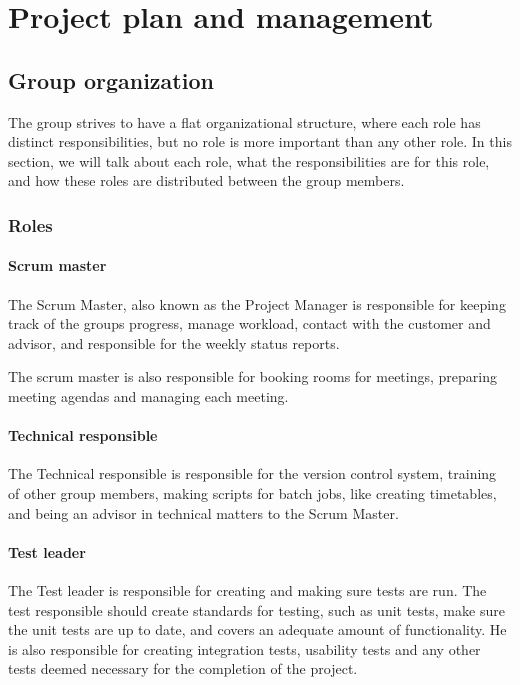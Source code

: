 \section{Project plan and management}


\subsection{Group organization}
The group strives to have a flat organizational structure, where each role has distinct responsibilities, but no role is more important than any other role. In this section, we will talk about each role, what the responsibilities are for this role, and how these roles are distributed between the group members.

\subsubsection{Roles}
\paragraph{\textbf{Scrum master}}
The Scrum Master, also known as the Project Manager is responsible for keeping track of the groups progress, manage workload, contact with the customer and advisor, and responsible for the weekly status reports.

The scrum master is also responsible for booking rooms for meetings, preparing meeting agendas and managing each meeting.

\paragraph{\textbf{Technical responsible}}
The Technical responsible is responsible for the version control system, training of other group members, making scripts for batch jobs, like creating timetables, and being an advisor in technical matters to the Scrum Master.

\paragraph{\textbf{Test leader}}
The Test leader is responsible for creating and making sure tests are run. The test responsible should create standards for testing, such as unit tests, make sure the unit tests are up to date, and covers an adequate amount of functionality. He is also responsible for creating integration tests, usability tests and any other tests deemed necessary for the completion of the project.

